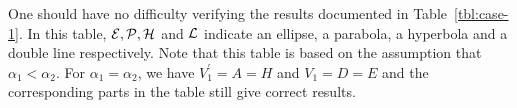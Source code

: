      One should have no difficulty verifying the results documented in
Table~\ref{tbl:case-1}.
In this table, $\cal E, P, H$ and $\cal L$ indicate an ellipse, a parabola, a
hyperbola and a double line respectively.  Note that this table is based on
the assumption that $\alpha_1<\alpha_2$.  For $\alpha_1=\alpha_2$, we have
$V_1^\prime=A=H$ and $V_1=D=E$ and the corresponding parts in the table still
give correct results.

